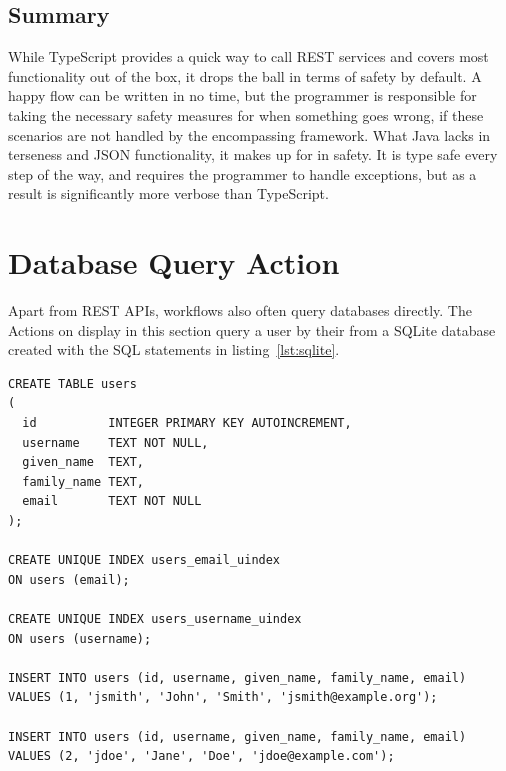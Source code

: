 \subsection{Summary}
While TypeScript provides a quick way to call REST services and covers most functionality out of the box, it drops the ball in terms of safety by default. A happy flow can be written in no time, but the programmer is responsible for taking the necessary safety measures for when something goes wrong, if these scenarios are not handled by the encompassing framework. What Java lacks in terseness and JSON functionality, it makes up for in safety. It is type safe every step of the way, and requires the programmer to handle exceptions, but as a result is significantly more verbose than TypeScript.

\pagebreak
\section{Database Query Action}
Apart from REST APIs, workflows also often query databases directly. The Actions on display in this section query a user by their from a SQLite database created with the SQL statements in listing~\ref{lst:sqlite}.
\begin{listing}[H]
    \begin{verbatim}
CREATE TABLE users
(
  id          INTEGER PRIMARY KEY AUTOINCREMENT,
  username    TEXT NOT NULL,
  given_name  TEXT,
  family_name TEXT,
  email       TEXT NOT NULL
);

CREATE UNIQUE INDEX users_email_uindex
ON users (email);

CREATE UNIQUE INDEX users_username_uindex
ON users (username);

INSERT INTO users (id, username, given_name, family_name, email) 
VALUES (1, 'jsmith', 'John', 'Smith', 'jsmith@example.org');
  
INSERT INTO users (id, username, given_name, family_name, email) 
VALUES (2, 'jdoe', 'Jane', 'Doe', 'jdoe@example.com');
    \end{verbatim}
    \caption{\label{lst:sqlite}DDL and seed for SQLite database}
\end{listing}
